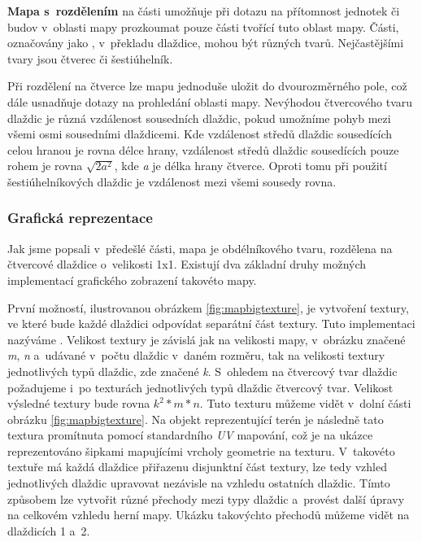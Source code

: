 \textbf{Mapa s~rozdělením} na části umožňuje při dotazu na přítomnost jednotek či budov v~oblasti mapy prozkoumat pouze části tvořící tuto oblast mapy. Části, označovány jako \textit{ }, v~překladu dlaždice, mohou být různých tvarů. Nejčastějšími tvary jsou čtverec či šestiúhelník. 

Při rozdělení na čtverce lze mapu jednoduše uložit do dvourozměrného pole, což dále usnadňuje dotazy na prohledání oblasti mapy. Nevýhodou čtvercového tvaru dlaždic je různá vzdálenost sousedních dlaždic, pokud umožníme pohyb mezi všemi osmi sousedními dlaždicemi. Kde vzdálenost středů dlaždic sousedících celou hranou je rovna délce hrany, vzdálenost středů dlaždic sousedících pouze rohem je rovna \(\sqrt{2a^2}\), kde \textit{a} je délka hrany čtverce. Oproti tomu při použití šestiúhelníkových dlaždic je vzdálenost mezi všemi sousedy rovna. 

\subsubsection{Grafická reprezentace} 
\label{sec:mapgraphicsanalaysis}
Jak jsme popsali v~předešlé části, mapa je obdélníkového tvaru, rozdělena na čtvercové dlaždice o~velikosti 1x1. Existují dva základní druhy možných implementací grafického zobrazení takovéto mapy.

První možností, ilustrovanou obrázkem \ref{fig:mapbigtexture}, je vytvoření textury, ve které bude každé dlaždici odpovídat separátní část textury. Tuto implementaci nazýváme . Velikost textury je závislá jak na velikosti mapy, v~obrázku značené \textit{m}, \textit{n} a~udávané v~počtu dlaždic v~daném rozměru, tak na velikosti textury jednotlivých typů dlaždic, zde značené \textit{k}. S~ohledem na čtvercový tvar dlaždic požadujeme i~po texturách jednotlivých typů dlaždic čtvercový tvar. Velikost výsledné textury bude rovna \(k^2 * m * n\). Tuto texturu můžeme vidět v~dolní části obrázku \ref{fig:mapbigtexture}. Na objekt reprezentující terén je následně tato textura promítnuta pomocí standardního \textit{UV} mapování, což je na ukázce reprezentováno šipkami mapujícími vrcholy geometrie na texturu. V~takovéto textuře má každá dlaždice přiřazenu disjunktní část textury, lze tedy vzhled jednotlivých dlaždic upravovat nezávisle na vzhledu ostatních dlaždic. Tímto způsobem lze vytvořit různé přechody mezi typy dlaždic a~provést další úpravy na celkovém vzhledu herní mapy. Ukázku takovýchto přechodů můžeme vidět na dlaždicích 1 a~2.
 
